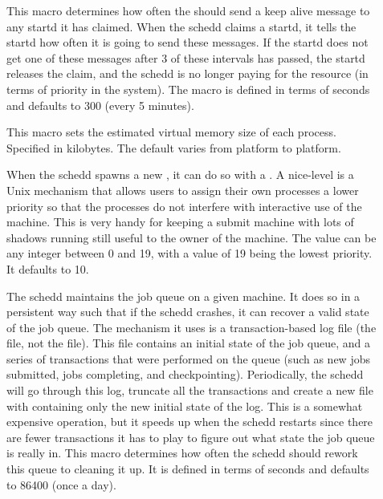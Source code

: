 \begin{description}
\item[] \label{param:AliveInterval} This
  macro determines how often the  should send a keep alive
  message to any startd it has claimed.  When the schedd claims a
  startd, it tells the startd how often it is going to send these
  messages.  If the startd does not get one of these messages after 3
  of these intervals has passed, the startd releases the claim, and
  the schedd is no longer paying for the resource (in terms of
  priority in the system).  The macro is defined in terms of seconds
  and defaults to 300 (every 5 minutes).

\item[] \label{param:ShadowSizeEstimate}
  This macro sets the estimated virtual memory size of each
   process.  Specified in kilobytes.  The default
  varies from platform to platform.

\item[]
  \label{param:ShadowReniceIncrement} When the schedd spawns a new
  , it can do so with a .  A
  nice-level is a
  Unix mechanism that allows users to assign their own processes a lower 
  priority so that the processes do not interfere with interactive use of the
  machine.  This is very handy for keeping a submit machine with lots
  of shadows running still useful to the owner of the machine.  The
  value can be any integer between 0 and 19, with a value of 19 being
  the lowest priority.  It defaults to 10.

\item[] \label{param:QueueCleanInterval}
  The schedd maintains the job queue on a given machine.  It does so
  in a persistent way such that if the schedd crashes, it can recover
  a valid state of the job queue.  The mechanism it uses is a
  transaction-based log file (the  file,
  not the  file).  This file contains an initial
  state of the job queue, and a series of transactions that were
  performed on the queue (such as new jobs submitted, jobs completing,
  and checkpointing).  Periodically, the schedd will go through
  this log, truncate all the transactions and create a new file with
  containing only the new initial state of the log.
  This is a somewhat expensive operation,
  but it speeds up when the schedd restarts since there are
  fewer transactions it has to play to figure out what state the job
  queue is really in.  This macro determines how often the schedd
  should rework this queue to cleaning it up.  It is defined in terms of
  seconds and defaults to 86400 (once a day). 
  

\end{description}
